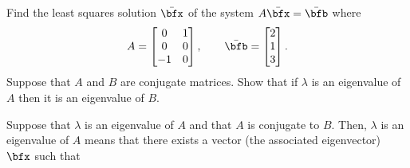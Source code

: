 \begin{questions}
  \question[6] Find the least squares solution $\bar\bfx$ of the system
  $A\bar{\bfx}=\bar{\bfb}$ where
  \[
    A=
    \begin{bmatrix}
      0&1\\
      0&0\\
      -1&0
    \end{bmatrix},
    \qquad
    \bar{\bfb}=
    \begin{bmatrix}
      2\\1\\3
    \end{bmatrix}.
  \]
  \vspace{1.5in}
  \question[4] Suppose that $A$ and $B$ are conjugate matrices. Show that
  if $\lambda$ is an eigenvalue of $A$ then it is an eigenvalue of $B$.
  \begin{solution}
    Suppose that $\lambda$ is an eigenvalue of $A$ and that $A$ is
    conjugate to $B$. Then, $\lambda$ is an eigenvalue of $A$ means that
    there exists a vector (the associated eigenvector) $\bfx$ such that

\end{solution}
\end{questions}
